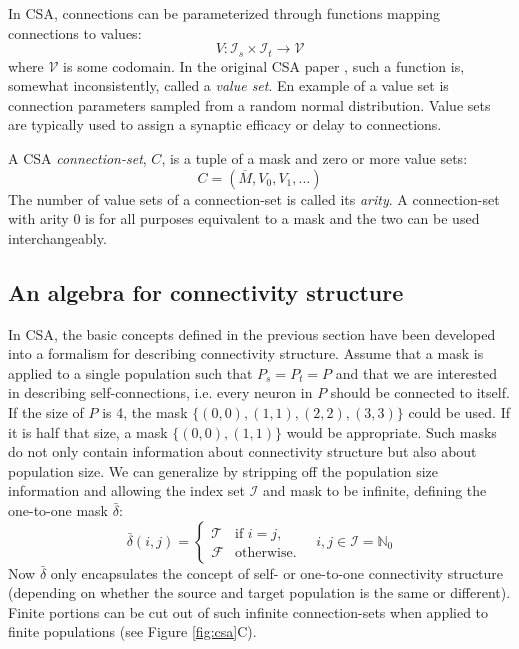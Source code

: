 \documentclass{frontiersSCNS} %
\begin{document}
In CSA, connections can be parameterized through functions mapping
connections to values:
\begin{equation}
V : \mathcal{I}_s \times \mathcal{I}_t \rightarrow \mathcal{V}
\end{equation}
where $\mathcal{V}$ is some codomain. In the original CSA paper
\citep{djurfeldt12}, such a function is, somewhat inconsistently,
called a \emph{value set}. En example of a value set is connection
parameters sampled from a random normal distribution. Value sets are
typically used to assign a synaptic efficacy or delay to connections.

A CSA \emph{connection-set}, $C$, is a tuple of a mask and zero or
more value sets:
\begin{equation}
C = (\overline{M}, V_0, V_1, ...)
\end{equation}
The number of value sets of a connection-set is called its
\emph{arity}. A connection-set with arity 0 is for all purposes
equivalent to a mask and the two can be used interchangeably.

\subsection{An algebra for connectivity structure}\label{sec:structure}

In CSA, the basic concepts defined in the previous section have been
developed into a formalism for describing connectivity structure.
Assume that a mask is applied to a single population such that $P_s =
P_t = P$ and that we are interested in describing self-connections,
i.e. every neuron in $P$ should be connected to itself.  If the size
of $P$ is 4, the mask $\{(0, 0), (1, 1), (2, 2), (3, 3)\}$ could be
used.  If it is half that size, a mask $\{(0, 0), (1, 1)\}$ would be
appropriate. Such masks do not only contain information about
connectivity structure but also about population size. We can
generalize by stripping off the population size information and
allowing the index set $\mathcal{I}$ and mask to be infinite, defining
the one-to-one mask $\bar{\delta}$:
\begin{equation}
  \bar{\delta}(i, j) =
      \begin{cases}
        \mathcal{T}& \text{if $i = j$},\\
        \mathcal{F}& \text{otherwise}.
      \end{cases}
      \quad i, j \in \mathcal{I} = \mathbb{N}_0
\end{equation}
Now $\bar{\delta}$ only encapsulates the concept of self- or
one-to-one connectivity structure (depending on whether the source and
target population is the same or different).  Finite portions can be
cut out of such infinite connection-sets when applied to finite
populations (see Figure \ref{fig:csa}C).
\end{document}
